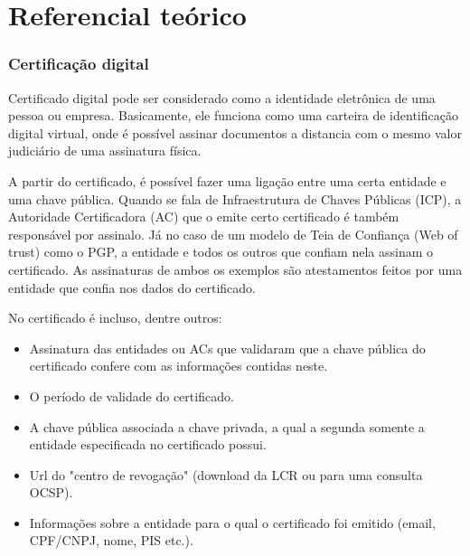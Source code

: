 \documentclass[
    openany,
    12pt,               %
    twoside,            %
    a4paper,            %
    english,            %
    brazil,             %
    ]{abntex2}
\begin{document}
\frenchspacing 

\imprimirfolhaderosto*

\tableofcontents
\cleardoublepage


\textual

\chapter{Referencial teórico}
\label{cap:ref-teorico}

\subsection{Certificação digital}
\label{cap:cert-digital}
Certificado digital pode ser considerado como a identidade eletrônica de uma pessoa ou empresa. Basicamente, ele funciona como uma carteira de identificação digital virtual, onde é possível assinar documentos a distancia com o mesmo valor judiciário de uma assinatura física. 

A partir do certificado, é possível fazer uma ligação entre uma certa entidade e uma chave pública. Quando se fala de Infraestrutura de Chaves Públicas (ICP), a Autoridade Certificadora (AC) que o emite certo certificado é também responsável por assinalo. Já no caso de um modelo de Teia de Confiança (Web of trust) como o PGP, a entidade e todos os outros que confiam nela assinam o certificado. As assinaturas de ambos os exemplos são atestamentos feitos por uma entidade que confia nos dados do certificado. 

No certificado é incluso, dentre outros:
\begin{itemize}
\item{Assinatura das entidades ou ACs que validaram que a chave pública do certificado confere com as informações contidas neste.}
\item{O período de validade do certificado.}
\item{A chave pública associada a chave privada, a qual a segunda somente a entidade especificada no certificado possui.}
\item{Url do "centro de revogação" (download da LCR ou para uma consulta OCSP).}
\item{Informações sobre a entidade para o qual o certificado foi emitido (email, CPF/CNPJ, nome, PIS etc.).}
\end{itemize}
\end{document}
